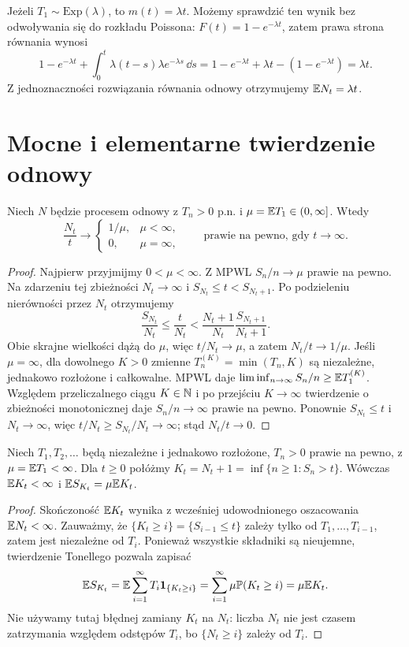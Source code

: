 \begin{przyklad}
Jeżeli $T_1\sim\mathrm{Exp}(\lambda)$, to $m(t)=\lambda t$.
Możemy sprawdzić ten wynik bez odwoływania się do rozkładu Poissona:
$F(t)=1-e^{-\lambda t}$, zatem prawa strona równania wynosi
\[
1-e^{-\lambda t}
+\int_0^t\lambda(t-s)\lambda e^{-\lambda s}\,\dd s
=1-e^{-\lambda t}+\lambda t-(1-e^{-\lambda t})
=\lambda t.
\]
Z jednoznaczności rozwiązania równania odnowy otrzymujemy
$\mathbb{E} N_t=\lambda t$.
\end{przyklad}

\section{Mocne i elementarne twierdzenie odnowy}
\begin{twierdzenie}
Niech $N$ będzie procesem odnowy z $T_n>0$ p.n.
i $\mu=\mathbb{E} T_1\in(0,\infty]$.
Wtedy
\[
\frac{N_t}{t}\longrightarrow
\begin{cases}1/\mu,&\mu<\infty,\\0,&\mu=\infty,\end{cases}
\qquad\text{prawie na pewno, gdy }t\to\infty.
\]
\end{twierdzenie}
\begin{proof}
Najpierw przyjmijmy $0<\mu<\infty$.
Z MPWL $S_n/n\to\mu$ prawie na pewno.
Na zdarzeniu tej zbieżności $N_t\to\infty$ i
$S_{N_t}\le t<S_{N_t+1}$. Po podzieleniu nierówności
przez $N_t$ otrzymujemy
\[
\frac{S_{N_t}}{N_t}\le \frac{t}{N_t}
<\frac{N_t+1}{N_t}\frac{S_{N_t+1}}{N_t+1}.
\]
Obie skrajne wielkości dążą do $\mu$, więc
$t/N_t\to\mu$, a zatem $N_t/t\to1/\mu$.
Jeśli $\mu=\infty$, dla dowolnego $K>0$ zmienne
$T_n^{(K)}=\min(T_n,K)$ są niezależne, jednakowo rozłożone
i całkowalne. MPWL daje
$\liminf_{n\to\infty}S_n/n\ge\mathbb{E} T_1^{(K)}$.
Względem przeliczalnego ciągu $K\in\mathbb{N}$ i po przejściu
$K\to\infty$ twierdzenie o zbieżności monotonicznej
daje $S_n/n\to\infty$ prawie na pewno.
Ponownie $S_{N_t}\le t$ i $N_t\to\infty$, więc
$t/N_t\ge S_{N_t}/N_t\to\infty$; stąd $N_t/t\to0$.
\end{proof}

\begin{lemat}
Niech $T_1,T_2,\ldots$ będą niezależne i jednakowo rozłożone,
$T_n>0$ prawie na pewno, z $\mu=\mathbb{E} T_1<\infty$.
Dla $t\ge0$ połóżmy $K_t=N_t+1=\inf\{n\ge1:S_n>t\}$.
Wówczas $\mathbb{E} K_t<\infty$ i
$\mathbb{E} S_{K_t}=\mu\mathbb{E} K_t$.
\end{lemat}
\begin{proof}
Skończoność $\mathbb{E} K_t$ wynika z wcześniej udowodnionego
oszacowania $\mathbb{E} N_t<\infty$. Zauważmy, że
$\{K_t\ge i\}=\{S_{i-1}\le t\}$ zależy tylko od
$T_1,\ldots,T_{i-1}$, zatem jest niezależne od $T_i$.
Ponieważ wszystkie składniki są nieujemne, twierdzenie Tonellego
pozwala zapisać
\[
\mathbb{E} S_{K_t}=\mathbb{E}\sum_{i=1}^\infty T_i\mathbf{1}_{\{K_t\ge i\}}
=\sum_{i=1}^\infty\mu\mathbb{P}(K_t\ge i)
=\mu\mathbb{E} K_t.
\]
Nie używamy tutaj błędnej zamiany $K_t$ na $N_t$:
liczba $N_t$ nie jest czasem zatrzymania względem
odstępów $T_i$, bo $\{N_t\ge i\}$ zależy od $T_i$.
\end{proof}

